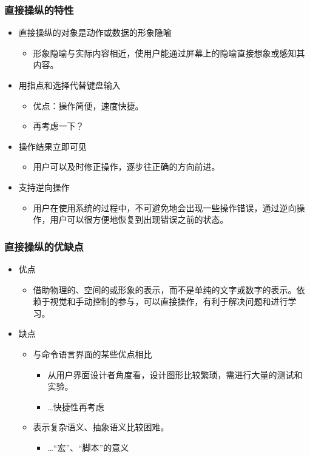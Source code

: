 \documentclass{beamer}
\begin{document}
\begin{frame}
	\frametitle{直接操纵的特性}
	\beamertemplatetransparentcovereddynamicmedium
	\begin{itemize}[<+->]
		\item 直接操纵的对象是动作或数据的形象隐喻
		\begin{itemize}
			\item 形象隐喻与实际内容相近，使用户能通过屏幕上的隐喻直接想象或感知其内容。
		\end{itemize}
		\item 用指点和选择代替键盘输入
		\begin{itemize}
			\item 优点：操作简便，速度快捷。
			\item 再考虑一下？ %
		\end{itemize}
		\item 操作结果立即可见
		\begin{itemize}
			\item 用户可以及时修正操作，逐步往正确的方向前进。
		\end{itemize}
		\item 支持逆向操作
		\begin{itemize}
			\item 用户在使用系统的过程中，不可避免地会出现一些操作错误，通过逆向操作，用户可以很方便地恢复到出现错误之前的状态。
		\end{itemize}
	\end{itemize}
\end{frame}

\begin{frame}
	\frametitle{直接操纵的优缺点}
	\beamertemplatetransparentcovereddynamicmedium
	\begin{itemize}[<+->]
		\item 优点
		\begin{itemize}
			\item 借助物理的、空间的或形象的表示，而不是单纯的文字或数字的表示。依赖于视觉和手动控制的参与，可以直接操作，有利于解决问题和进行学习。
		\end{itemize}
		\item 缺点
		\begin{itemize}
			\item 与命令语言界面的某些优点相比
			\begin{itemize}
				\item 从用户界面设计者角度看，设计图形比较繁琐，需进行大量的测试和实验。
				\item \dots 快捷性再考虑
			\end{itemize}
			\item 表示复杂语义、抽象语义比较困难。
			\begin{itemize}
				\item \dots “宏”、“脚本”的意义
			\end{itemize}
		\end{itemize}
	\end{itemize}
\end{frame}
\end{document}
